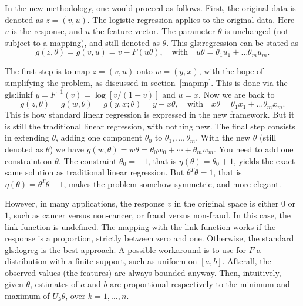 \documentclass[oneside,10pt]{book}
\begin{document}
In the new methodology, one would proceed as follows. First, the original data is denoted as $z=(v,u)$. The logistic regression applies to the original data. Here $v$ is the response, 
 and $u$ the feature vector. The parameter $\theta$ is unchanged (not subject to a mapping), and still denoted as $\theta$.  This \gls{gls:regression} can be stated as
$$
g(z,\theta)=g(v,u)= v-F(u\theta), \quad \text{with } \text{ } u\theta=\theta_1 u_1 + \dots \theta_m u_m.
$$

The first step is to map $z=(v,u)$ onto $w=(y,x)$, with the hope of simplifying the problem, as discussed in section~\ref{mapmp}. This is done
 via the \gls{gls:linkf} $y=F^{-1}(v)=\log[v/(1-v)]$ and $u=x$. Now we are back to 
$$
g(z,\theta)=g(w,\theta)=g(y,x;\theta)= y-x\theta, \quad \text{with } \text{ } x\theta=\theta_1 x_1 + \dots \theta_m x_m.
$$
This is how standard linear regression is expressed in the new framework. But it is still the traditional linear regression, with nothing new. The final step
 consists in extending $\theta$, adding one component $\theta_0$ to $\theta_1,\dots,\theta_m$. With the new $\theta$ (still denoted as $\theta$) we have $g(w,\theta)=w\theta=\theta_0 w_0+\cdots + \theta_m w_m$. You need to add one constraint on $\theta$. The constraint $\theta_0=-1$, 
 that is $\eta(\theta)=\theta_0+1$, yields the exact same solution as traditional linear regression. But $\theta^T\theta=1$, that is $\eta(\theta)=\theta^T\theta-1$, makes the problem somehow symmetric, and more elegant.

However, in many applications, the response $v$ in the original space is either $0$ or $1$, such as cancer versus non-cancer, or fraud versus non-fraud.  In this case, the link function is undefined. The mapping with the link function works if the response is a proportion, strictly between zero and one. Otherwise, the standard \gls{gls:logreg} is the best approach. 
 A possible workaround is to use for $F$ a distribution with a finite support, such as uniform on $[a,b]$. Afterall, the observed values (the features) are always bounded anyway. Then, intuitively, given $\theta$, estimates of $a$ and $b$ are proportional respectively to the minimum and maximum of $U_k\theta$, over $k=1,\dots,n$. 
\end{document}
